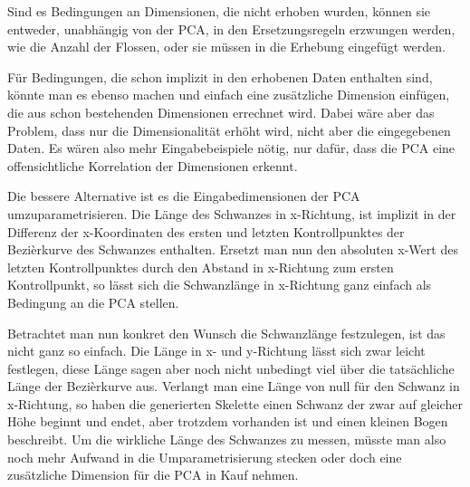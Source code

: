  Sind es Bedingungen an Dimensionen, die nicht erhoben wurden, können  sie entweder, unabhängig von der PCA, in den Ersetzungsregeln erzwungen werden, wie \zb die Anzahl der Flossen, oder sie müssen in die Erhebung eingefügt werden.
 
 Für Bedingungen, die schon implizit in den erhobenen Daten enthalten sind,
 könnte man es ebenso machen und einfach eine zusätzliche Dimension einfügen, die aus schon bestehenden Dimensionen errechnet wird. Dabei wäre aber das Problem, dass nur die Dimensionalität erhöht wird, nicht aber die eingegebenen Daten. Es wären also mehr Eingabebeispiele nötig, nur dafür, dass die PCA eine offensichtliche Korrelation der Dimensionen erkennt.
 
 Die bessere Alternative ist es die Eingabedimensionen der PCA umzuparametrisieren. Die Länge des Schwanzes in x-Richtung, ist \zb implizit in der Differenz der x-Koordinaten des ersten und letzten Kontrollpunktes der Bezièrkurve des Schwanzes enthalten. Ersetzt man nun den absoluten x-Wert des letzten Kontrollpunktes durch den Abstand in x-Richtung zum ersten Kontrollpunkt, so lässt sich die Schwanzlänge in x-Richtung ganz einfach als Bedingung an die PCA stellen. 
 
 Betrachtet man nun konkret den Wunsch die Schwanzlänge festzulegen, ist das nicht ganz so einfach. Die Länge in x- und y-Richtung lässt sich zwar leicht festlegen, diese Länge sagen aber noch nicht unbedingt viel über die tatsächliche Länge der Bezièrkurve aus. Verlangt man \zb eine Länge von null für den Schwanz in x-Richtung, so haben die generierten Skelette einen Schwanz der zwar auf gleicher Höhe beginnt und endet, aber trotzdem vorhanden ist und einen kleinen Bogen beschreibt. 
 Um die wirkliche Länge des Schwanzes zu messen, müsste man also noch mehr Aufwand in die Umparametrisierung stecken oder doch eine zusätzliche Dimension für die PCA in Kauf nehmen.
 
 
